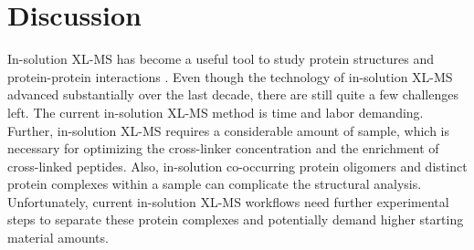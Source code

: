\section{Discussion}
In-solution XL-MS has become a useful tool to study protein structures and protein-protein interactions \cite{Henry_2018, Koukos_2020, Liu_2014}. Even though the technology of in-solution XL-MS advanced substantially over the last decade, there are still quite a few challenges left. The current in-solution XL-MS method is time and labor demanding. Further, in-solution XL-MS requires a considerable amount of sample, which is necessary for optimizing the cross-linker concentration and the enrichment of cross-linked peptides. Also, in-solution co-occurring protein oligomers and distinct protein complexes within a sample can complicate the structural analysis. Unfortunately, current in-solution XL-MS workflows need further experimental steps to separate these protein complexes and potentially demand higher starting material amounts.\\
